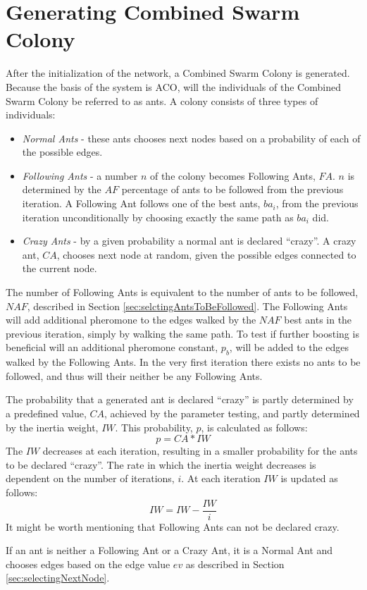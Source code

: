 \section{Generating Combined Swarm Colony}
\label{sec:algoGeneratingSuperSwarm}
After the initialization of the network, a Combined Swarm Colony is generated. Because the basis of the system is ACO, will the individuals of the Combined Swarm Colony be referred to as ants. A colony consists of three types of individuals:

\begin{itemize}
\item \textit{Normal Ants} - these ants chooses next nodes based on a probability of each of the possible edges. 
\item \textit{Following Ants} - a number $n$ of the colony becomes Following Ants, $FA$. $n$ is determined by the $AF$ percentage of ants to be followed from the previous iteration. A Following Ant follows one of the best ants, $ba_i$, from the previous iteration unconditionally by choosing exactly the same path as $ba_i$ did.
\item \textit{Crazy Ants} - by a given probability a normal ant is declared ``crazy''. A crazy ant, $CA$, chooses next node at random, given the possible edges connected to the current node.  
\end{itemize}
The number of Following Ants is equivalent to the number of ants to be followed, $NAF$, described in Section \vref{sec:selctingAntsToBeFollowed}. The Following Ants will add additional pheromone to the edges walked by the $NAF$ best ants in the previous iteration, simply by walking the same path. To test if further boosting is beneficial will an additional pheromone constant, $p_b$, will be added to the edges walked by the Following Ants. In the very first iteration there exists no ants to be followed, and thus will their neither be any Following Ants. 

The probability that a generated ant is declared ``crazy'' is partly determined by a predefined value, $CA$, achieved by the parameter testing, and partly determined by the inertia weight, $IW$. This probability, $p$, is calculated as follows:
$$p = CA*IW$$
The $IW$ decreases at each iteration, resulting in a smaller probability for the ants to be declared ``crazy''. The rate in which the inertia weight decreases is dependent on the number of iterations, $i$. At each iteration $IW$ is updated as follows:
$$IW = IW - \frac{IW}{i}$$
It might be worth mentioning that Following Ants can not be declared crazy. 

If an ant is neither a Following Ant or a Crazy Ant, it is a Normal Ant and chooses edges based on the edge value $ev$ as described in Section \vref{sec:selectingNextNode}.